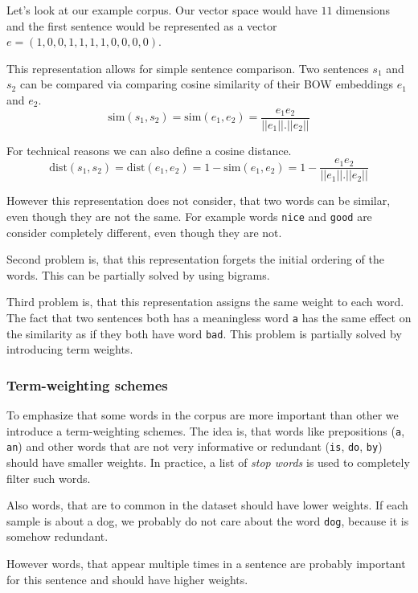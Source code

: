     Let's look at our example corpus. 
    Our vector space would have $11$ dimensions and the first sentence would be represented as a vector
    $e = (1, 0, 0, 1, 1, 1, 1, 0, 0, 0, 0)$.
    
    This representation allows for simple sentence comparison. 
    Two sentences $s_1$ and $s_2$ can be compared via comparing cosine similarity of their BOW embeddings $e_1$ and $e_2$.
    $$\mathrm{sim}(s_1, s_2) = \mathrm{sim}(e_1, e_2) = \frac{e_1 e_2}{||e_1||.||e_2||}$$
    
    For technical reasons we can also define a cosine distance. 
    $$\mathrm{dist}(s_1, s_2) = \mathrm{dist}(e_1, e_2) = 1- \mathrm{sim}(e_1, e_2) = 1 - \frac{e_1 e_2}{||e_1||.||e_2||}$$
    
    However this representation does not consider, that two words can be similar, even though they are not the same.
    For example words \texttt{nice} and \texttt{good} are consider completely different, even though they are not. 
    
    Second problem is, that this representation forgets the initial ordering of the words.
    This can be partially solved by using bigrams.
    
    Third problem is, that this representation assigns the same weight to each word.
    The fact that two sentences both has a meaningless word \texttt{a} has the same effect on the similarity as 
    if they both have word \texttt{bad}. 
    This problem is partially solved by introducing term weights.
    
    
    \subsubsection{Term-weighting schemes}
    
    To emphasize that some words in the corpus are more important than other we introduce a term-weighting schemes. 
    The idea is, that words like prepositions (\texttt{a}, \texttt{an}) and other words that are not very informative or redundant (\texttt{is}, \texttt{do}, \texttt{by}) should have smaller weights. 
    In practice, a list of \textit{stop words} is used to completely filter such words.
    
    Also words, that are to common in the dataset should have lower weights.
    If each sample is about a dog, we probably do not care about the word \texttt{dog}, because it is somehow redundant.
    
    However words, that appear multiple times in a sentence are probably important for this sentence and should have higher weights.
    
